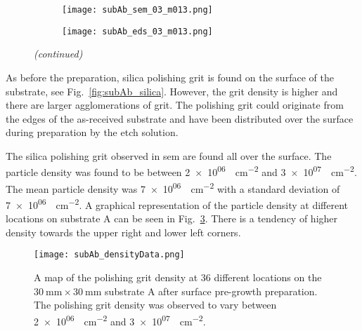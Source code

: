 \begin{figure}[htbp]
\ContinuedFloat
    \centering
    \begin{subfigure}[t]{\textwidth}
          \begin{minipage}[t]{0.49\linewidth}
            \centering
            \texttt{[image: subAb\_sem\_03\_m013.png]}
          \end{minipage}
          \hspace{0.02\linewidth}
          \begin{minipage}[t]{0.49\linewidth}
            \centering
            \texttt{[image: subAb\_eds\_03\_m013.png]}
          \end{minipage}
        \caption{}\label{fig:add_label}
    \end{subfigure}
    \captionsetup{list=no}
    \caption{\emph{(continued)}}
\end{figure}

As before the preparation, silica polishing grit is found on the surface of the substrate, see Fig.~\ref{fig:subAb_silica}. However, the grit density is higher and there are larger agglomerations of grit. The polishing grit could originate from the edges of the as-received substrate and have been distributed over the surface during preparation by the etch solution.

The silica polishing grit observed in \ac{sem} are found all over the surface. The particle density was found to be between \SI{2e+06}{\particle\centi\metre^{-2}} and \SI{3e+07}{\particle\centi\metre^{-2}}. The mean particle density was \SI{7e+06}{\particle\centi\metre^{-2}} with a standard deviation of \SI{7e+06}{\particle\centi\metre^{-2}}. A graphical representation of the particle density at different locations on substrate A can be seen in Fig.~\ref{fig:subAb_densityData}. There is a tendency of higher density towards the upper right and lower left corners.

\begin{figure}[htbp]
    \centering
    \texttt{[image: subAb\_densityData.png]}
    \caption[Map of the polishing grit density on substrate A after surface pre-growth preparation.]{A map of the polishing grit density at 36 different locations on the $\SI{30}{\milli\metre}\times\SI{30}{\milli\metre}$ substrate A after surface pre-growth preparation. The polishing grit density was observed to vary between \SI{2e+06}{\particle\centi\metre^{-2}} and \SI{3e+07}{\particle\centi\metre^{-2}}.}
    \label{fig:subAb_densityData}
\end{figure}

